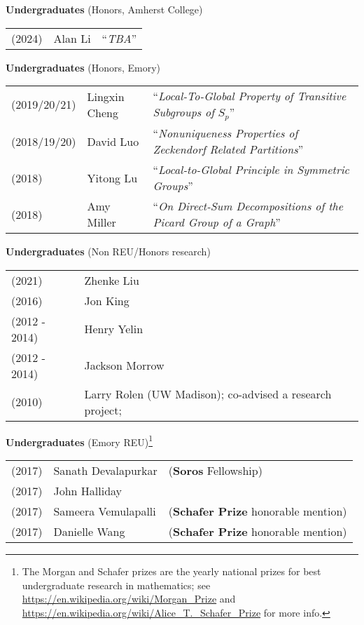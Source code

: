 \documentclass[margin,line]{res}
\newcommand{\defi}[1]{\textsf{#1}} 				%
\begin{document}
\begin{resume}
\begin{tabular}{lll}
\end{tabular}


{\bf Undergraduates} (Honors, Amherst College)
\vspace*{-.15in}

\begin{tabular}{lll}
  (2024) & \defi{Alan Li} & ``\emph{TBA}''
\end{tabular}

{\bf Undergraduates} (Honors, Emory)
\vspace*{-.15in}

\begin{tabular}{lll}
  (2019/20/21) & \defi{Lingxin Cheng} & ``\emph{Local-To-Global Property of Transitive Subgroups of} $S_p$''\\
  (2018/19/20) & \defi{David Luo} & ``\emph{Nonuniqueness Properties of Zeckendorf Related Partitions}'' \\
  (2018) & \defi{Yitong Lu} & ``\emph{Local-to-Global Principle in Symmetric Groups}'' \\
  (2018) & \defi{Amy Miller} & ``\emph{On Direct-Sum Decompositions of the Picard Group of a Graph}''
\end{tabular}

{\bf Undergraduates} (Non REU/Honors research)
\vspace*{-.15in}

\begin{tabular}{ll}
 (2021) & \defi{Zhenke Liu} \\
 (2016) & \defi{Jon King} \\  
 (2012 - 2014) & \defi{Henry Yelin} \\
 (2012 - 2014) & \defi{Jackson Morrow} \\
 (2010) &  \defi{Larry Rolen} (UW Madison); co-advised a research project; \\
\end{tabular}


{\bf Undergraduates} (Emory REU)\footnote{The Morgan and Schafer prizes are the yearly national prizes for best undergraduate research in mathematics; see \url{https://en.wikipedia.org/wiki/Morgan_Prize} and \url{https://en.wikipedia.org/wiki/Alice_T._Schafer_Prize} for more info.}
\vspace*{-.15in}

\begin{tabular}{lll}

(2017) & Sanath Devalapurkar  & (\textbf{Soros} Fellowship) \\
(2017) & John Halliday & \\
(2017) &  Sameera Vemulapalli & (\textbf{Schafer Prize} honorable mention)  \\
(2017) & Danielle Wang & (\textbf{Schafer Prize} honorable mention)  \\


\end{tabular}
\end{resume}
\end{document}
